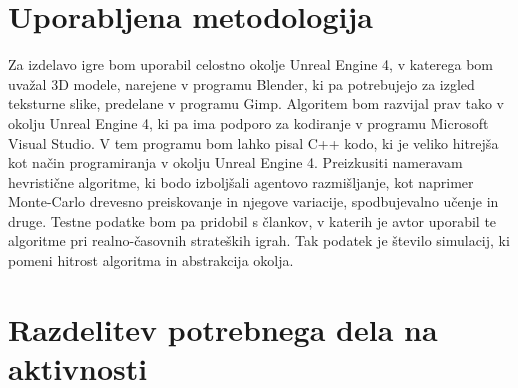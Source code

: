 \documentclass[11pt,a4paper]{article}
\begin{document}
\section{Uporabljena metodologija}


Za izdelavo igre bom uporabil celostno okolje Unreal Engine 4, v katerega bom uvažal 3D modele, narejene v programu Blender, ki pa potrebujejo za izgled teksturne slike, predelane v programu Gimp.
Algoritem bom razvijal prav tako v okolju Unreal Engine 4, ki pa ima podporo za kodiranje v programu Microsoft Visual Studio. V tem programu bom lahko pisal C++ kodo, ki je veliko hitrejša kot način programiranja v okolju Unreal Engine 4.
Preizkusiti nameravam hevristične algoritme, ki bodo izboljšali agentovo razmišljanje, kot naprimer Monte-Carlo drevesno preiskovanje in njegove variacije, spodbujevalno učenje in druge.
Testne podatke bom pa pridobil s člankov, v katerih je avtor uporabil te algoritme pri realno-časovnih strateških igrah. Tak podatek je število simulacij, ki pomeni hitrost algoritma in abstrakcija okolja.




\section{Razdelitev potrebnega dela na aktivnosti}
\end{document}
